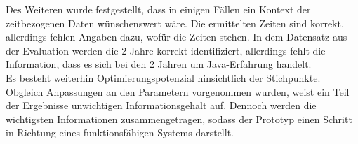Des Weiteren wurde festgestellt, dass in einigen Fällen ein Kontext der zeitbezogenen Daten wünschenswert wäre. Die ermittelten Zeiten sind korrekt, allerdings fehlen Angaben dazu, wofür die Zeiten stehen. In dem Datensatz aus der Evaluation werden die 2 Jahre korrekt identifiziert, allerdings fehlt die Information, dass es sich bei den 2 Jahren um Java-Erfahrung handelt.\\

Es besteht weiterhin Optimierungspotenzial hinsichtlich der Stichpunkte. Obgleich Anpassungen an den Parametern vorgenommen wurden, weist ein Teil der Ergebnisse unwichtigen Informationsgehalt auf. Dennoch werden die wichtigsten Informationen zusammengetragen, sodass der Prototyp einen Schritt in Richtung eines funktionsfähigen Systems darstellt.
\newpage
